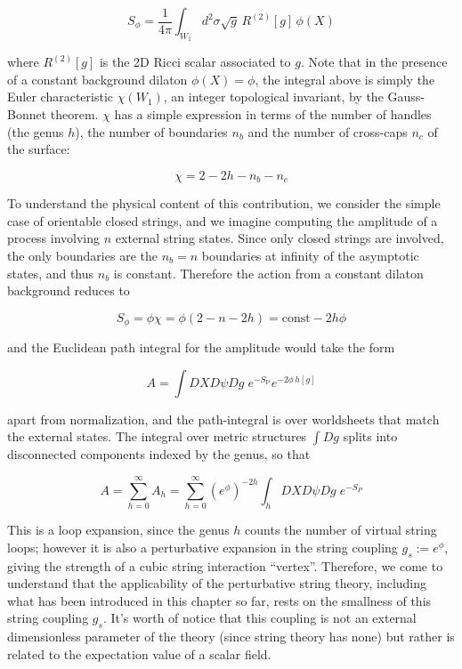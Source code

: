 \begin{equation}
	S_\phi = \frac{1}{4\pi} \int_{W_1} d^2 \sigma \sqrt g \, R^{(2)}[g] \, \phi(X)
	\label{}
\end{equation}

where $R^{(2)}[g]$ is the 2D Ricci scalar associated to $g$. Note that in the presence of a constant background dilaton $\phi(X) = \phi$, the integral above is simply the Euler characteristic $\chi(W_1)$, an integer topological invariant, by the Gauss-Bonnet theorem. $\chi$ has a simple expression in terms of the number of handles (the genus $h$), the number of boundaries $n_b$ and the number of cross-caps $n_c$ of the surface:

\begin{equation}
	\chi = 2 - 2h - n_b - n_c
	\label{}
\end{equation}

To understand the physical content of this contribution, we consider the simple case of orientable closed strings, and we imagine computing the amplitude of a process involving $n$ external string states. Since only closed strings are involved, the only boundaries are the $n_b = n$ boundaries at infinity of the asymptotic states, and thus $n_b$ is constant. Therefore the action from a constant dilaton background reduces to

\begin{equation}
	S_\phi = \phi \chi = \phi(2 - n - 2h) = \text{const} - 2h\phi
	\label{}
\end{equation}

and the Euclidean path integral for the amplitude would take the form

\begin{equation}
	A = \int DX D\psi Dg \; e^{-S_\text{P}} e^{-2\phi \, h[g]}
	\label{}
\end{equation}

apart from normalization, and the path-integral is over worldsheets that match the external states. The integral over metric structures $\int Dg$ splits into disconnected components indexed by the genus, so that

\begin{equation}
	A = \sum_{h=0}^{\infty} A_h = \sum_{h=0}^\infty (e^\phi)^{-2h} \int_h DX D\psi Dg \; e^{-S_P}
	\label{perturbationseries}
\end{equation}

This is a loop expansion, since the genus $h$ counts the number of virtual string loops; however it is also a perturbative expansion in the string coupling $g_s := e^\phi$, giving the strength of a cubic string interaction ``vertex''. Therefore, we come to understand that the applicability of the perturbative string theory, including what has been introduced in this chapter so far, rests on the smallness of this string coupling $g_s$. It's worth of notice that this coupling is not an external dimensionless parameter of the theory (since string theory has none) but rather is related to the expectation value of a scalar field.

